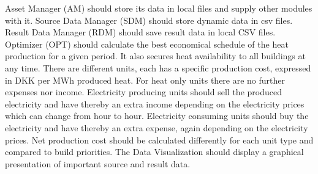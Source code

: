 \hspace*{1cm}\textcolor{nounred}{Asset Manager (AM)} should \textcolor{verbblue}{store} its \textcolor{nounred}{data} in local \textcolor{nounred}{files} and \textcolor{verbblue}{supply} other \textcolor{nounred}{modules} with it. \textcolor{nounred}{Source Data Manager (SDM)} should \textcolor{verbblue}{store} \textcolor{nounred}{dynamic data} in \textcolor{nounred}{csv files}. \textcolor{nounred}{Result Data Manager (RDM)} should \textcolor{verbblue}{save} \textcolor{nounred}{result data} in local \textcolor{nounred}{CSV files}. \textcolor{nounred}{Optimizer (OPT)} should \textcolor{verbblue}{calculate} the best \textcolor{nounred}{economical schedule} of the \textcolor{nounred}{heat production} for a given \textcolor{nounred}{period}. It also \textcolor{verbblue}{secures} \textcolor{nounred}{heat availability} to all \textcolor{nounred}{buildings} at any \textcolor{nounred}{time}. There are different \textcolor{nounred}{units}, each \textcolor{verbblue}{has} a specific \textcolor{nounred}{production cost}, expressed in \textcolor{nounred}{DKK} per MWh produced \textcolor{nounred}{heat}. For \textcolor{nounred}{heat only units} there are no further \textcolor{nounred}{expenses} nor \textcolor{nounred}{income}. \textcolor{nounred}{Electricity producing units} should \textcolor{verbblue}{sell} the produced \textcolor{nounred}{electricity} and \textcolor{verbblue}{have} thereby an extra \textcolor{nounred}{income} depending on the \textcolor{nounred}{electricity prices} which can \textcolor{verbblue}{change} from \textcolor{nounred}{hour} to \textcolor{nounred}{hour}. \textcolor{nounred}{Electricity consuming units} should \textcolor{verbblue}{buy} the \textcolor{nounred}{electricity} and \textcolor{verbblue}{have} thereby an extra \textcolor{nounred}{expense}, again depending on the \textcolor{nounred}{electricity prices}. \textcolor{nounred}{Net production cost} should be \textcolor{verbblue}{calculated} differently for each \textcolor{nounred}{unit type} and \textcolor{verbblue}{compared} to build \textcolor{nounred}{priorities}. The \textcolor{nounred}{Data Visualization} should \textcolor{verbblue}{display} a \textcolor{nounred}{graphical presentation} of important \textcolor{nounred}{source and result data}.

\vspace{2em}

